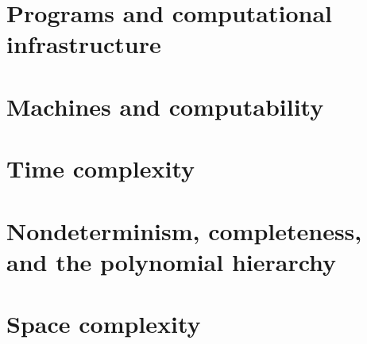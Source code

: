 \tableofcontents
\part{Programs and computational infrastructure}






\part{Machines and computability}










\part{Time complexity}





\part{Nondeterminism, completeness, and the polynomial hierarchy}






\part{Space complexity}










